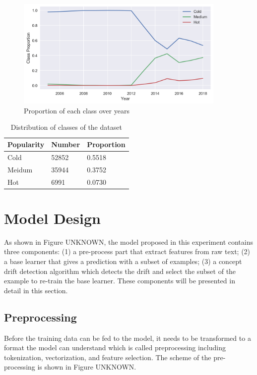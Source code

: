 \begin{figure}
\centering
\includegraphics[width=0.9\textwidth]{proportion_hypes.png}
\caption{Proportion of each class over years}
\label{proportion_yeas}
\end{figure}


\begin{table}[]
\centering
\begin{tabular}{lll}
\multicolumn{1}{c}{Popularity} & \multicolumn{1}{c}{Number} & Proportion \\ \hline
Cold                           & 52852                      & 0.5518     \\
Meidum                         & 35944                      & 0.3752     \\
Hot                            & 6991                       & 0.0730    
\end{tabular}
\caption{Distribution of classes of the dataset}
\label{distribution_classes}
\end{table}




\section{Model Design}
As shown in Figure UNKNOWN, the model proposed in this experiment contains three components: (1) a pre-process part that extract features from raw text; (2) a base learner that gives a prediction with a subset of examples; (3) a concept drift detection algorithm which detects the drift and select the subset of the example to re-train the base learner. These components will be presented in detail in this section.

\subsection{Preprocessing}
Before the training data can be fed to the model, it needs to be transformed to a format the model can understand which is called preprocessing including tokenization, vectorization, and feature selection. The scheme of the pre-processing is shown in Figure UNKNOWN.

